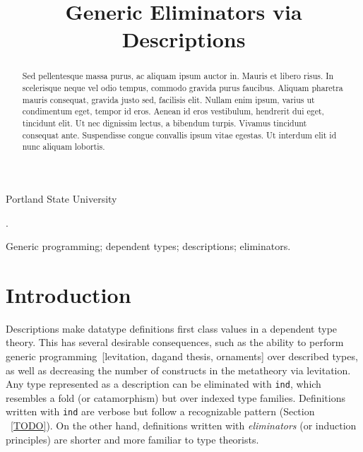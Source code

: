 \documentclass[preprint,authoryear]{sigplanconf}
\begin{document}
\setlength{\pdfpageheight}{\paperheight}
\setlength{\pdfpagewidth}{\paperwidth}


\title{Generic Eliminators via Descriptions}

           {Portland State University}

\maketitle

\begin{abstract}
Sed pellentesque massa purus, ac aliquam ipsum auctor in. Mauris et
libero risus. In scelerisque neque vel odio tempus, commodo gravida
purus faucibus. Aliquam pharetra mauris consequat, gravida justo sed,
facilisis elit. Nullam enim ipsum, varius ut condimentum eget, tempor
id eros. Aenean id eros vestibulum, hendrerit dui eget, tincidunt
elit. Ut nec dignissim lectus, a bibendum turpis. Vivamus tincidunt
consequat ante. Suspendisse congue convallis ipsum vitae egestas. Ut
interdum elit id nunc aliquam lobortis.
\end{abstract}

.

\keywords
Generic programming; dependent types; descriptions; eliminators.

\section{Introduction}
\label{sec:intro}

Descriptions make datatype definitions first class values in a
dependent type theory. This has several desirable consequences, such as the
ability to perform generic programming~[levitation, dagand thesis, ornaments]
over described types, as well as decreasing the number of constructs in the
metatheory via levitation. Any type represented as a description can
be eliminated with {\tt ind}, which resembles a fold (or catamorphism) but
over indexed type families. Definitions written with {\tt ind} are
verbose but follow a recognizable pattern (Section ~\ref{TODO}). 
On the other hand, definitions written with {\it eliminators} (or
induction principles) are shorter and more familiar to type theorists.
\end{document}
